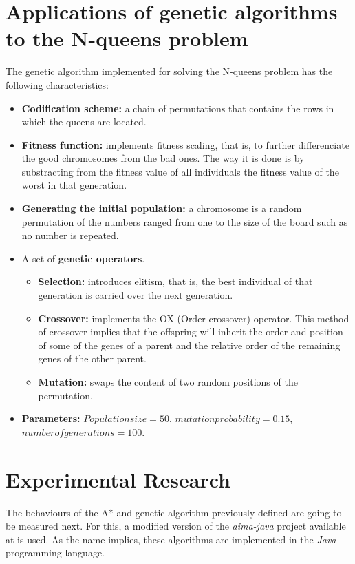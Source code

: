 \documentclass[11pt]{llncs}
\begin{document}
\section{Applications of genetic algorithms to the N-queens problem}\label{gen_nqueens}
The genetic algorithm implemented for solving the N-queens problem has the following characteristics:
\begin{itemize}
    \item \textbf{Codification scheme:} a chain of permutations that contains the rows in which the queens are located.
    \item \textbf{Fitness function:} implements fitness scaling, that is, to further differenciate the good chromosomes from the bad ones. The way it is done is by substracting from the fitness value of all individuals the fitness value of the worst in that generation. 
    \item \textbf{Generating the initial population:} a chromosome is a random permutation of the numbers ranged from one to the size of the board such as no number is repeated.
    \item A set of \textbf{genetic operators}. 
    \begin{itemize}
        \item \textbf{Selection:} introduces elitism, that is, the best individual of that generation is carried over the next generation.
        \item \textbf{Crossover:} implements the OX (Order crossover) operator. This method of crossover implies that the offspring will inherit the order and position of some of the genes of a parent and the relative order of the remaining genes of the other parent.
        \item \textbf{Mutation:} swaps the content of two random positions of the permutation.
    \end{itemize}
    \item \textbf{Parameters:} $Population size = 50$, $mutation probability = 0.15$, $number of generations = 100$.
\end{itemize}
\section{Experimental Research}\label{exp_research}
The behaviours of the A* and genetic algorithm previously defined are going to be measured next. For this, a modified version of the \textit{aima-java} project available at \cite{aimajava} is used. As the name implies, these algorithms are implemented in the \textit{Java} programming language.
\end{document}
